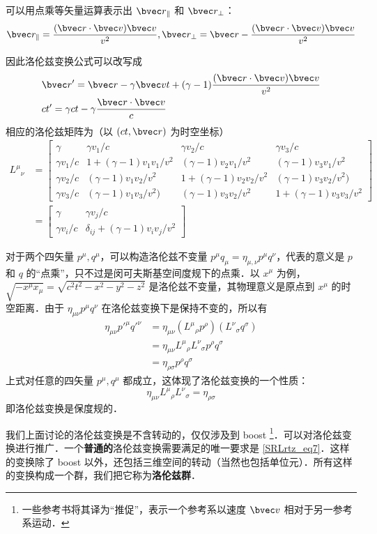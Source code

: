 可以用点乘等矢量运算表示出 $\bvec r_\parallel$ 和 $\bvec r_\perp$：
\begin{equation}
\bvec r_{\parallel}=\frac{(\bvec r\cdot \bvec v)\bvec v}{v^2},\bvec r_{\perp}=\bvec r-\frac{(\bvec r\cdot \bvec v)\bvec v}{v^2}
\end{equation}

因此洛伦兹变换公式可以改写成
\begin{equation}
\begin{aligned}
&\bvec r'=\bvec r-\gamma\bvec v t+(\gamma-1)\frac{(\bvec r\cdot \bvec v)\bvec v}{v^2}\\
&ct'=\gamma ct-\gamma\frac{\bvec r\cdot\bvec v}{c}
\end{aligned}
\end{equation}
相应的洛伦兹矩阵为（以 $(ct,\bvec r)$ 为时空坐标）
\begin{equation}\label{SRLrtz_eq6}
\begin{aligned}
{L^\mu}_\nu&=
\left[\begin{matrix}
\gamma& \gamma v_1/c & \gamma v_2/c& \gamma v_3/c\\
\gamma v_1/c&1+(\gamma-1)v_1v_1/v^2& (\gamma-1)v_2v_1/v^2&(\gamma-1)v_3v_1/v^2\\
\gamma v_2/c &(\gamma-1)v_1v_2/v^2&1+(\gamma-1)v_2v_2/v^2&(\gamma-1)v_3v_2/v^2)\\
\gamma v_3/c&(\gamma-1)v_1v_3/v^2)&(\gamma-1)v_3v_2/v^2&1+(\gamma-1)v_3v_3/v^2
\end{matrix}\right]\\
&=\left[\begin{matrix}
\gamma & \gamma v_j/c \\
\gamma v_i/c & \delta_{ij}+(\gamma-1)v_iv_j/v^2
\end{matrix}
\right]
\end{aligned}
\end{equation}

对于两个四矢量 $p^\mu,q^\mu$，可以构造洛伦兹不变量 $p^\mu q_\mu=\eta_{\mu,\nu}p^\mu q^\nu$，代表的意义是 $p$ 和 $q$ 的“点乘”，只不过是闵可夫斯基空间度规下的点乘．以 $x^\mu$ 为例，$\sqrt{-x^\mu x_\mu}=\sqrt{c^2t^2-x^2-y^2-z^2}$ 是洛伦兹不变量，其物理意义是原点到 $x^\mu$ 的时空距离．由于 $\eta_{\mu\nu}p^\mu q^\nu$ 在洛伦兹变换下是保持不变的，所以有
\begin{equation}
\begin{aligned}
\eta_{\mu\nu}p'^\mu q'^\nu&=\eta_{\mu\nu}({L^\mu}_\rho p^\rho) ({L^\nu}_\sigma q^\sigma)\\
&=\eta_{\mu\nu}{L^\mu}_\rho {L^\nu}_\sigma p^\rho q^\sigma
\\
&=\eta_{\rho\sigma} p^\rho q^\sigma
\end{aligned}
\end{equation}
上式对任意的四矢量 $p^\mu,q^\mu$ 都成立，这体现了洛伦兹变换的一个性质：
\begin{equation}\label{SRLrtz_eq7}
\eta_{\mu\nu}{L^\mu}_\rho {L^\nu}_\sigma=\eta_{\rho\sigma}
\end{equation}
即洛伦兹变换是保度规的．

我们上面讨论的洛伦兹变换是不含转动的，仅仅涉及到 boost \footnote{一些参考书将其译为“推促”，表示一个参考系以速度 $\bvec v$ 相对于另一参考系运动．}．可以对洛伦兹变换进行推广．一个\textbf{普通的}洛伦兹变换需要满足的唯一要求是 \autoref{SRLrtz_eq7}．这样的变换除了 boost 以外，还包括三维空间的转动（当然也包括单位元）．所有这样的变换构成一个群，我们把它称为\textbf{洛伦兹群}．
